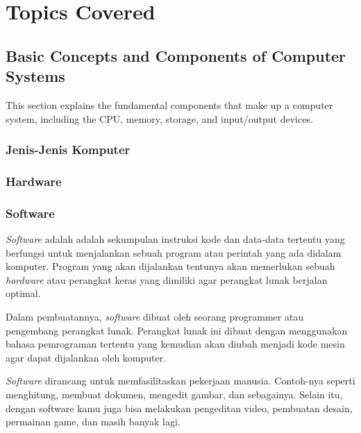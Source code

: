 \documentclass[12pt]{article}
\begin{document}
\section{Topics Covered}

\subsection{Basic Concepts and Components of Computer Systems}
This section explains the fundamental components that make up a computer system, including the CPU, memory, storage, and input/output devices.
\subsubsection{Jenis-Jenis Komputer}
\subsubsection{Hardware}
\subsubsection{Software}
    \par
    \textit{Software} adalah adalah sekumpulan instruksi kode dan data-data tertentu yang berfungsi untuk menjalankan sebuah program atau perintah yang ada didalam komputer. Program yang akan dijalankan tentunya akan memerlukan sebuah \textit{hardware} atau perangkat keras yang dimiliki agar perangkat lunak berjalan optimal.

    Dalam pembuatannya, \textit{software} dibuat oleh seorang programmer atau pengembang perangkat lunak. Perangkat lunak ini dibuat dengan menggunakan bahasa pemrograman tertentu yang kemudian akan diubah menjadi kode mesin agar dapat dijalankan oleh komputer.

    \textit{Software} dirancang untuk memfasilitaskan pekerjaan manusia. Contoh-nya seperti menghitung, membuat dokumen, mengedit gambar, dan sebagainya. Selain itu, dengan software kamu juga bisa melakukan pengeditan video, pembuatan desain, permainan game, dan masih banyak lagi.
\end{document}
